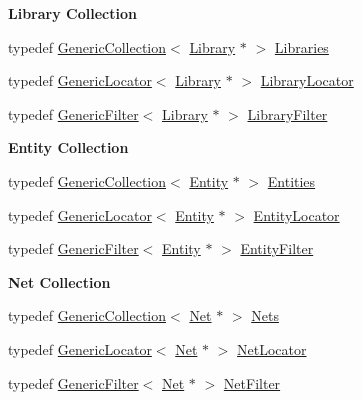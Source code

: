 \begin{Indent}\textbf{ Library Collection}\par
\begin{DoxyCompactItemize}
\item 
typedef \hyperlink{classHurricane_1_1GenericCollection}{Generic\+Collection}$<$ \hyperlink{classHurricane_1_1Library}{Library} $\ast$ $>$ \hyperlink{namespaceHurricane_a2868a53bbb0507710460ff02fab77cad}{Libraries}
\item 
typedef \hyperlink{classHurricane_1_1GenericLocator}{Generic\+Locator}$<$ \hyperlink{classHurricane_1_1Library}{Library} $\ast$ $>$ \hyperlink{namespaceHurricane_a0477ab8ee799bb25ce9521ac16dbb6b9}{Library\+Locator}
\item 
typedef \hyperlink{classHurricane_1_1GenericFilter}{Generic\+Filter}$<$ \hyperlink{classHurricane_1_1Library}{Library} $\ast$ $>$ \hyperlink{namespaceHurricane_a72d63f6bfd54feac2663e60430fd443d}{Library\+Filter}
\end{DoxyCompactItemize}
\end{Indent}
\begin{Indent}\textbf{ Entity Collection}\par
\begin{DoxyCompactItemize}
\item 
typedef \hyperlink{classHurricane_1_1GenericCollection}{Generic\+Collection}$<$ \hyperlink{classHurricane_1_1Entity}{Entity} $\ast$ $>$ \hyperlink{namespaceHurricane_af50ef2888fd2a5b58b0de14cdfaabc56}{Entities}
\item 
typedef \hyperlink{classHurricane_1_1GenericLocator}{Generic\+Locator}$<$ \hyperlink{classHurricane_1_1Entity}{Entity} $\ast$ $>$ \hyperlink{namespaceHurricane_ad3f039057bc40adfd993d83ace24fb83}{Entity\+Locator}
\item 
typedef \hyperlink{classHurricane_1_1GenericFilter}{Generic\+Filter}$<$ \hyperlink{classHurricane_1_1Entity}{Entity} $\ast$ $>$ \hyperlink{namespaceHurricane_af0fe741a1ef28dedcb26bf979b1dea5c}{Entity\+Filter}
\end{DoxyCompactItemize}
\end{Indent}
\begin{Indent}\textbf{ Net Collection}\par
\begin{DoxyCompactItemize}
\item 
typedef \hyperlink{classHurricane_1_1GenericCollection}{Generic\+Collection}$<$ \hyperlink{classHurricane_1_1Net}{Net} $\ast$ $>$ \hyperlink{namespaceHurricane_a3404a8b17130a1824f4a281704b04df7}{Nets}
\item 
typedef \hyperlink{classHurricane_1_1GenericLocator}{Generic\+Locator}$<$ \hyperlink{classHurricane_1_1Net}{Net} $\ast$ $>$ \hyperlink{namespaceHurricane_a2911512d442f8332c3cd3a135332cc02}{Net\+Locator}
\item 
typedef \hyperlink{classHurricane_1_1GenericFilter}{Generic\+Filter}$<$ \hyperlink{classHurricane_1_1Net}{Net} $\ast$ $>$ \hyperlink{namespaceHurricane_a0dfd2c5b40325a919d139091312732e9}{Net\+Filter}
\end{DoxyCompactItemize}
\end{Indent}
